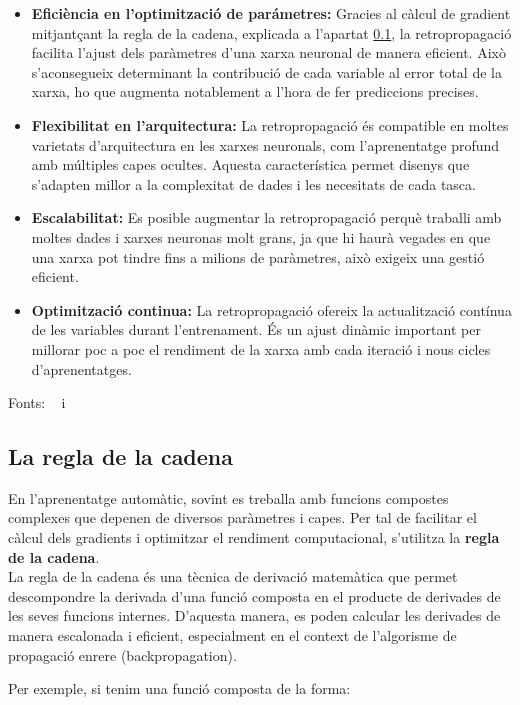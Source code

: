 \begin{itemize}
 \item \textbf{Eficiència en l'optimització de parámetres:} Gracies al càlcul de gradient mitjantçant la regla de la cadena, explicada a l'apartat \ref{subsec:cadena}, la retropropagació facilita l'ajust dels paràmetres d'una xarxa neuronal de manera eficient. Això s'aconsegueix determinant la contribució de cada variable al error total de la xarxa, ho que augmenta notablement a l'hora de fer prediccions precises.
 \item \textbf{Flexibilitat en l'arquitectura:} La retropropagació és compatible en moltes varietats d'arquitectura en les xarxes neuronals, com l'aprenentatge profund amb múltiples capes ocultes. Aquesta característica permet disenys que s'adapten millor a la complexitat de dades i les necesitats de cada tasca.
 \item \textbf{Escalabilitat:} Es posible augmentar la retropropagació perquè traballi amb moltes dades i xarxes neuronas molt grans, ja que hi haurà vegades en que una xarxa pot tindre fins a milions de paràmetres, això exigeix una gestió eficient.
 \item \textbf{Optimització continua:} La retropropagació ofereix la actualització contínua de les variables durant l'entrenament. És un ajust dinàmic important per millorar poc a poc el rendiment de la xarxa amb cada iteració i nous cicles d'aprenentatges.
\end{itemize}
Fonts: ~\cite{valencia} i~\cite{Retropropagacio}


\subsection{La regla de la cadena}\label{subsec:cadena}

En l'aprenentatge automàtic, sovint es treballa amb funcions compostes complexes que depenen de diversos paràmetres i capes. Per tal de facilitar el càlcul dels gradients i optimitzar el rendiment computacional, s'utilitza la \textbf{regla de la cadena}.\\

La regla de la cadena és una tècnica de derivació matemàtica que permet descompondre la derivada d'una funció composta en el producte de derivades de les seves funcions internes. D’aquesta manera, es poden calcular les derivades de manera escalonada i eficient, especialment en el context de l’algorisme de propagació enrere (backpropagation).

Per exemple, si tenim una funció composta de la forma:

